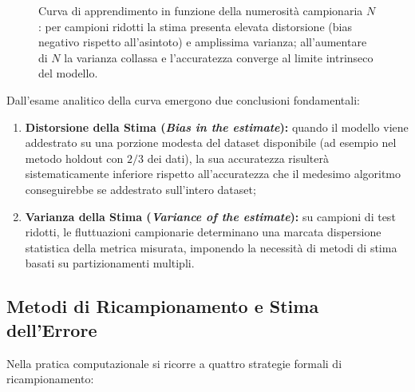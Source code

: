 \begin{figure}[H]
{%
}
\caption{Curva di apprendimento in funzione della numerosità campionaria $N$: per campioni ridotti la stima presenta elevata distorsione (bias negativo rispetto all'asintoto) e amplissima varianza; all'aumentare di $N$ la varianza collassa e l'accuratezza converge al limite intrinseco del modello.}
\label{fig:dm-learning-curve-sample-size}
\end{figure}

Dall'esame analitico della curva emergono due conclusioni fondamentali:
\begin{enumerate}
    \item \textbf{Distorsione della Stima (\textit{Bias in the estimate}):} quando il modello viene addestrato su una porzione modesta del dataset disponibile (ad esempio nel metodo holdout con $2/3$ dei dati), la sua accuratezza risulterà sistematicamente inferiore rispetto all'accuratezza che il medesimo algoritmo conseguirebbe se addestrato sull'intero dataset;
    \item \textbf{Varianza della Stima (\textit{Variance of the estimate}):} su campioni di test ridotti, le fluttuazioni campionarie determinano una marcata dispersione statistica della metrica misurata, imponendo la necessità di metodi di stima basati su partizionamenti multipli.
\end{enumerate}

\FloatBarrier
\subsection{Metodi di Ricampionamento e Stima dell'Errore}
\label{subsec:dm-resampling-methods}

Nella pratica computazionale si ricorre a quattro strategie formali di ricampionamento:

